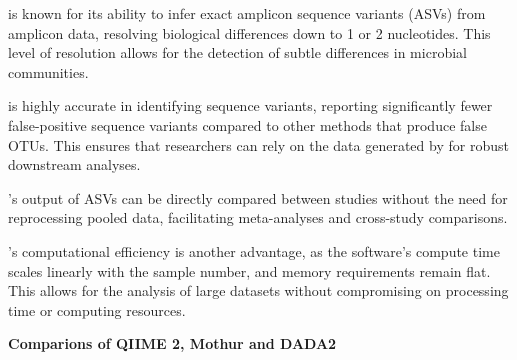                  is known for its ability to infer exact amplicon sequence variants (ASVs) from amplicon data, resolving biological differences down to 1 or 2 nucleotides. This level of resolution allows for the detection of subtle differences in microbial communities.
                
                 is highly accurate in identifying sequence variants, reporting significantly fewer false-positive sequence variants compared to other methods that produce false OTUs. This ensures that researchers can rely on the data generated by  for robust downstream analyses.
                
                's output of ASVs can be directly compared between studies without the need for reprocessing pooled data, facilitating meta-analyses and cross-study comparisons.
                
                's computational efficiency is another advantage, as the software's compute time scales linearly with the sample number, and memory requirements remain flat. This allows for the analysis of large datasets without compromising on processing time or computing resources.


            \textbf{Comparions of QIIME 2, Mothur and DADA2}

